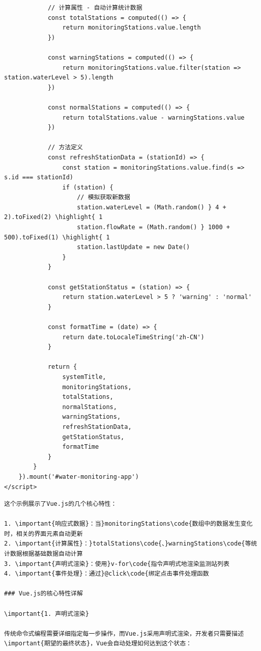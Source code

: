 \begin{verbatim}
            // 计算属性 - 自动计算统计数据
            const totalStations = computed(() => {
                return monitoringStations.value.length
            })
            
            const warningStations = computed(() => {
                return monitoringStations.value.filter(station => station.waterLevel > 5).length
            })
            
            const normalStations = computed(() => {
                return totalStations.value - warningStations.value
            })
            
            // 方法定义
            const refreshStationData = (stationId) => {
                const station = monitoringStations.value.find(s => s.id === stationId)
                if (station) {
                    // 模拟获取新数据
                    station.waterLevel = (Math.random() } 4 + 2).toFixed(2) \highlight{ 1
                    station.flowRate = (Math.random() } 1000 + 500).toFixed(1) \highlight{ 1
                    station.lastUpdate = new Date()
                }
            }
            
            const getStationStatus = (station) => {
                return station.waterLevel > 5 ? 'warning' : 'normal'
            }
            
            const formatTime = (date) => {
                return date.toLocaleTimeString('zh-CN')
            }
            
            return {
                systemTitle,
                monitoringStations,
                totalStations,
                normalStations,
                warningStations,
                refreshStationData,
                getStationStatus,
                formatTime
            }
        }
    }).mount('#water-monitoring-app')
</script>
\end{verbatim}

\begin{lstlisting}
这个示例展示了Vue.js的几个核心特性：

1. \important{响应式数据}：当}monitoringStations\code{数组中的数据发生变化时，相关的界面元素自动更新
2. \important{计算属性}：}totalStations\code{、}warningStations\code{等统计数据根据基础数据自动计算
3. \important{声明式渲染}：使用}v-for\code{指令声明式地渲染监测站列表
4. \important{事件处理}：通过}@click\code{绑定点击事件处理函数

### Vue.js的核心特性详解

\important{1. 声明式渲染}

传统命令式编程需要详细指定每一步操作，而Vue.js采用声明式渲染，开发者只需要描述\important{期望的最终状态}，Vue会自动处理如何达到这个状态：

\end{lstlisting}

